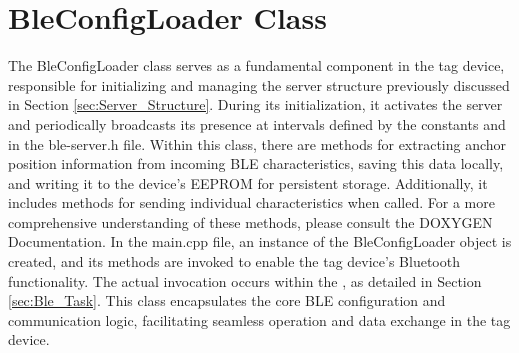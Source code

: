 \section{BleConfigLoader Class}
The BleConfigLoader class serves as a fundamental component in the tag device, responsible for initializing and managing the server structure previously discussed in Section \ref{sec:Server_Structure}. During its initialization, it activates the server and periodically broadcasts its presence at intervals defined by the constants  and  in the ble-server.h file.
\vspace{4pt}
\newline
Within this class, there are methods for extracting anchor position information from incoming BLE characteristics, saving this data locally, and writing it to the device's EEPROM for persistent storage. Additionally, it includes methods for sending individual characteristics when called. For a more comprehensive understanding of these methods, please consult the DOXYGEN Documentation.
\vspace{4pt}
\newline
In the main.cpp file, an instance of the BleConfigLoader object is created, and its methods are invoked to enable the tag device's Bluetooth functionality. The actual invocation occurs within the , as detailed in Section \ref{sec:Ble_Task}. This class encapsulates the core BLE configuration and communication logic, facilitating seamless operation and data exchange in the tag device.






